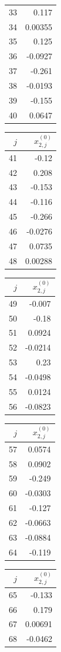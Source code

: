 {\begin{tabular}[t]{r|r}
33 & 0.117 \\
34 & 0.00355 \\
35 & 0.125 \\
36 & -0.0927 \\
37 & -0.261 \\
38 & -0.0193 \\
39 & -0.155 \\
40 & 0.0647
\end{tabular}\kern4pt
\begin{tabular}[t]{r|r}
$j$ & $x^{(0)}_{2,j}$ \\\hline
41 & -0.12 \\
42 & 0.208 \\
43 & -0.153 \\
44 & -0.116 \\
45 & -0.266 \\
46 & -0.0276 \\
47 & 0.0735 \\
48 & 0.00288
\end{tabular}\kern4pt
\begin{tabular}[t]{r|r}
$j$ & $x^{(0)}_{2,j}$ \\\hline
49 & -0.007 \\
50 & -0.18 \\
51 & 0.0924 \\
52 & -0.0214 \\
53 & 0.23 \\
54 & -0.0498 \\
55 & 0.0124 \\
56 & -0.0823
\end{tabular}\kern4pt
\begin{tabular}[t]{r|r}
$j$ & $x^{(0)}_{2,j}$ \\\hline
57 & 0.0574 \\
58 & 0.0902 \\
59 & -0.249 \\
60 & -0.0303 \\
61 & -0.127 \\
62 & -0.0663 \\
63 & -0.0884 \\
64 & -0.119
\end{tabular}\kern4pt
\begin{tabular}[t]{r|r}
$j$ & $x^{(0)}_{2,j}$ \\\hline
65 & -0.133 \\
66 & 0.179 \\
67 & 0.00691 \\
68 & -0.0462 \\

\end{tabular}}
